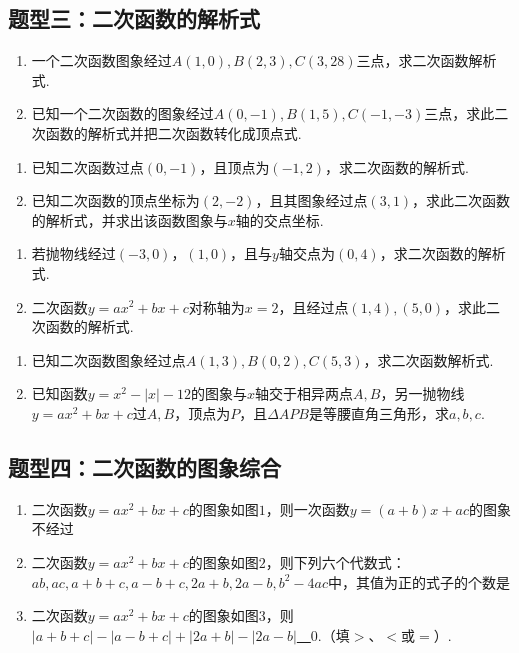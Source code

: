 \documentclass[10pt]{ctexart}
\newcommand{\abs}[1]{\left| #1 \right|}
\begin{document}
\subsection{题型三：二次函数的解析式}
\begin{dkyi}{}{}
  \begin{enumerate}[(1)]
  \item 一个二次函数图象经过$A(1,0),B(2,3),C(3,28)$三点，求二次函数解析式.
  \item 已知一个二次函数的图象经过$A(0,-1),B(1,5),C(-1,-3)$三点，求此二次函数的解析式并把二次函数转化成顶点式.
  \end{enumerate}
\end{dkyi}
\begin{dkyi}{}{}
  \begin{enumerate}[(1)]
  \item 已知二次函数过点$(0,-1)$，且顶点为$(-1,2)$，求二次函数的解析式.
  \item 已知二次函数的顶点坐标为$(2,-2)$，且其图象经过点$(3,1)$，求此二次函数的解析式，并求出该函数图象与$x$轴的交点坐标.
  \end{enumerate}
\end{dkyi}
\begin{jply}{}{}
   \begin{enumerate}[(1)]
   \item 若抛物线经过$(-3,0)$，$(1,0)$，且与$y$轴交点为$(0,4)$，求二次函数的解析式.
   \item 二次函数$y=ax^2+bx+c$对称轴为$x=2$，且经过点$(1,4),(5,0)$，求此二次函数的解析式.
   \end{enumerate}
\end{jply}
\begin{jply}{}{}
   \begin{enumerate}[(1)]
   \item 已知二次函数图象经过点$A(1,3),B(0,2),C(5,3)$，求二次函数解析式.
   \item 已知函数$y=x^2-\abs{x}-12$的图象与$x$轴交于相异两点$A,B$，另一抛物线$y=ax^2+bx+c$过$A,B$，顶点为$P$，且$\Delta APB$是等腰直角三角形，求$a,b,c$.
   \end{enumerate}
\end{jply}
\subsection{题型四：二次函数的图象综合}
\begin{dkyi}{}{}
  \begin{enumerate}[(1)]
  \item 二次函数$y=ax^2+bx+c$的图象如图$1$，则一次函数$y=(a+b)x+ac$的图象不经过
  
  \item 二次函数$y=ax^2+bx+c$的图象如图$2$，则下列六个代数式：$ab,ac,a+b+c,a-b+c,2a+b,2a-b,b^2-4ac$中，其值为正的式子的个数是
  
  \item 二次函数$y=ax^2+bx+c$的图象如图$3$，则$\abs{a+b+c}-\abs{a-b+c}+\abs{2a+b}-\abs{2a-b}$\underline{~\hspace{1cm}~}$0$.（填$>$、$<$或$=$）.
  \end{enumerate}
\end{dkyi}
\end{document}
